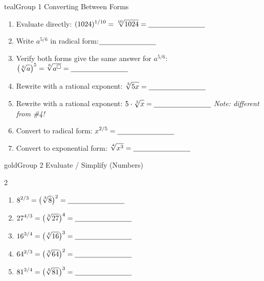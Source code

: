 \documentclass[12pt]{article}
\newcommand{\blank}{\underline{\hspace{2.8cm}}}
\begin{document}
\begin{pracbox}{teal}{Group 1 \quad Converting Between Forms}
\vspace{4pt}
\begin{enumerate}[label=\textbf{\arabic*.}, itemsep=18pt]

  \item Evaluate directly:\quad
        $\displaystyle(1024)^{1/10}=\sqrt[10]{1024}=\blank$

  \item Write $a^{5/6}$ in radical form:\quad $\blank$

  \item Verify both forms give the same answer for $a^{5/6}$:\quad
        $\displaystyle\bigl(\sqrt[6]{a}\bigr)^5 = \sqrt[6]{a^{\square}}
        = \blank$

  \item Rewrite with a rational exponent:\quad
        $\displaystyle\sqrt[3]{5x} = \blank$

  \item Rewrite with a rational exponent:\quad
        $\displaystyle 5\cdot\sqrt[3]{x} = \blank$
        \hfill{\small\itshape Note: different from \#4!}

  \item Convert to radical form:\quad
        $\displaystyle x^{2/5} = \blank$

  \item Convert to exponential form:\quad
        $\displaystyle\sqrt[4]{x^3} = \blank$

\end{enumerate}
\vspace{4pt}
\end{pracbox}

\vspace{10pt}

\begin{pracbox}{gold}{Group 2 \quad Evaluate / Simplify (Numbers)}
\vspace{4pt}
\begin{multicols}{2}
\begin{enumerate}[label=\textbf{\arabic*.}, itemsep=20pt, start=8]

  \item $\displaystyle 8^{2/3}=\bigl(\sqrt[3]{8}\bigr)^2=\blank$

  \item $\displaystyle 27^{4/3}=\bigl(\sqrt[3]{27}\bigr)^4=\blank$

  \item $\displaystyle 16^{3/4}=\bigl(\sqrt[4]{16}\bigr)^3=\blank$

  \item $\displaystyle 64^{2/3}=\bigl(\sqrt[3]{64}\bigr)^2=\blank$

  \item $\displaystyle 81^{3/4}=\bigl(\sqrt[4]{81}\bigr)^3=\blank$

\end{enumerate}
\end{multicols}
\vspace{4pt}
\end{pracbox}
\end{document}
